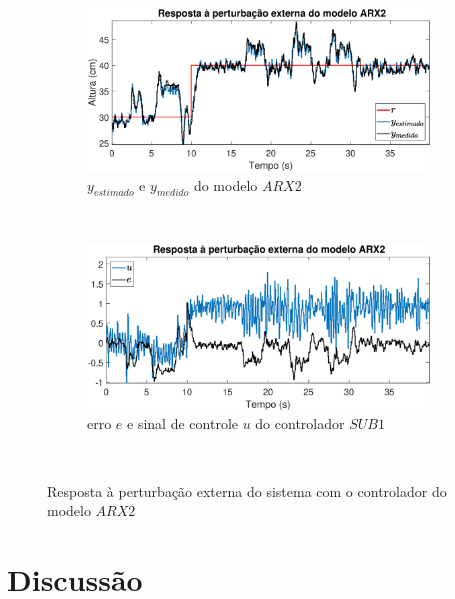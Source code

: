 \begin{figure}[H]
	\centering
	\begin{subfigure}[b]{1\textwidth}
		\includegraphics[width=1\linewidth]{pextrarx2y}
		\caption[$y_{estimado}$ e $y_{medido}$ do modelo $ARX2$]{$y_{estimado}$ e $y_{medido}$ do modelo $ARX2$}
		\label{fig:pextrarx2y}
	\end{subfigure}
	~ %
	\begin{subfigure}[b]{1\textwidth}
		\includegraphics[width=1\linewidth]{pextrarx2e}
		\caption[erro $e$ e sinal de controle $u$ do controlador $SUB1$]{erro $e$ e sinal de controle $u$ do controlador $SUB1$}
		\label{fig:pextrarx2e}
	\end{subfigure}
	~ %
	
	\caption{Resposta à perturbação externa do sistema com o controlador do modelo $ARX2$}\label{fig:pextrarx2}
\end{figure}



\section{Discussão}

